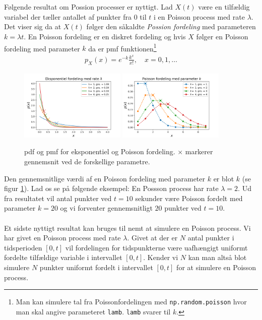 \\ \\
Følgende resultat om Possion processer er nyttigt. Lad $X(t)$ være en tilfældig variabel der tæller antallet af punkter fra $0$ til $t$ i en Poisson process med rate $\lambda$. Det viser sig da at $X(t)$ følger den såkaldte \textit{Possion fordeling} med parameteren $k = \lambda t$. En Poisson fordeling er en diskret fordeling og hvis $X$ følger en Poisson fordeling med parameter $k$ da er pmf funktionen\footnote{Man kan simulere tal fra Poissonfordelingen med \texttt{np.random.poisson} hvor man skal angive parameteret \texttt{lamb}. \texttt{lamb} svarer til $k$.}
\begin{align*}
p_X(x) = e^{-k}\frac{k^x}{x!}, \quad x = 0,1,\dots
\end{align*}

\begin{figure}
\centering
\includegraphics[width = 0.45\textwidth]{exp_dist.png}
\includegraphics[width = 0.45\textwidth]{poiss_dist.png}
\caption{pdf og pmf for eksponentiel og Poisson fordeling. $\times$ markerer gennemsnit ved de forskellige parametre.} \label{fig:distributions}
\end{figure}
Den gennemsnitlige værdi af en Poisson fordeling med parameter $k$ er blot $k$ (se figur \ref{fig:distributions}). Lad os se på følgende eksempel: En Possson process har rate $\lambda = 2$. Ud fra resultatet vil antal punkter ved $t = 10$ sekunder være Poisson fordelt med parameter $k = 20$ og vi forventer gennemsnitligt $20$ punkter ved $t = 10$. 
\\ \\
Et sidste nyttigt resultat kan bruges til nemt at simulere en Poisson process. Vi har givet en Poisson process med rate $\lambda$. Givet at der er $N$ antal punkter i tidsperioden $[0,t]$ vil fordelingen for tidspunkterne være uafhængigt uniformt fordelte tilfældige variable i intervallet $[0,t]$. Kender vi $N$ kan man altså blot simulere $N$ punkter uniformt fordelt i intervallet $[0,t]$ for at simulere en Poisson process.
